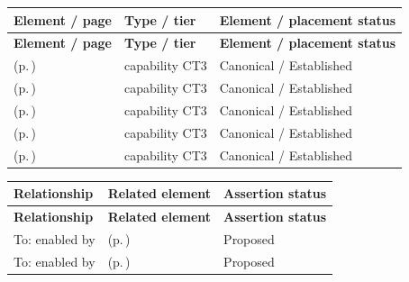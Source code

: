 \begingroup\small\setlength{\TableWidth}{\dimexpr\linewidth-6\tabcolsep-4\arrayrulewidth\relax}
\begin{longtable}{|>{\raggedright\arraybackslash}p{0.52\TableWidth}|>{\raggedright\arraybackslash}p{0.2\TableWidth}|>{\raggedright\arraybackslash}p{0.28\TableWidth}|}
\hline\rowcolor{TableHead}\textbf{Element / page} & \textbf{Type / tier} & \textbf{Element / placement status}\\\hline\endfirsthead
\hline\rowcolor{TableHead}\textbf{Element / page} & \textbf{Type / tier} & \textbf{Element / placement status}\\\hline\endhead
\hline\endfoot
\nameref{cap:bc-population-health-longitudinal-assessment} (p.\,\pageref{cap:bc-population-health-longitudinal-assessment}) & capability CT3 & Canonical / Established\\\hline
\nameref{cap:bc-population-health-surveillance-management} (p.\,\pageref{cap:bc-population-health-surveillance-management}) & capability CT3 & Canonical / Established\\\hline
\nameref{cap:bc-population-health-event-identification} (p.\,\pageref{cap:bc-population-health-event-identification}) & capability CT3 & Canonical / Established\\\hline
\nameref{cap:bc-notifiable-health-event-management} (p.\,\pageref{cap:bc-notifiable-health-event-management}) & capability CT3 & Canonical / Established\\\hline
\nameref{cap:bc-population-health-reporting} (p.\,\pageref{cap:bc-population-health-reporting}) & capability CT3 & Canonical / Established\\\hline
\end{longtable}\endgroup

\begingroup\small\setlength{\TableWidth}{\dimexpr\linewidth-6\tabcolsep-4\arrayrulewidth\relax}
\begin{longtable}{|>{\raggedright\arraybackslash}p{0.27\TableWidth}|>{\raggedright\arraybackslash}p{0.48\TableWidth}|>{\raggedright\arraybackslash}p{0.25\TableWidth}|}
\hline\rowcolor{TableHead}\textbf{Relationship} & \textbf{Related element} & \textbf{Assertion status}\\\hline\endfirsthead
\hline\rowcolor{TableHead}\textbf{Relationship} & \textbf{Related element} & \textbf{Assertion status}\\\hline\endhead
\hline\endfoot
To: enabled by & \nameref{cap:bec-population-health-notification-enablement} (p.\,\pageref{cap:bec-population-health-notification-enablement}) & Proposed\\\hline
To: enabled by & \nameref{cap:bec-health-information-access} (p.\,\pageref{cap:bec-health-information-access}) & Proposed\\\hline
\end{longtable}\endgroup

